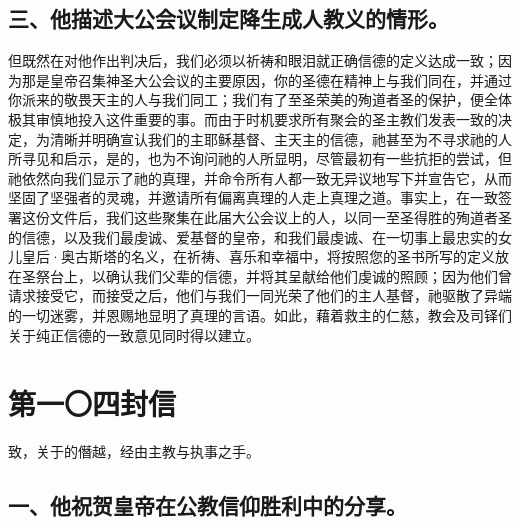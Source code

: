 
\subsection{三、他描述大公会议制定降生成人教义的情形。}

但既然在对他作出判决后，我们必须以祈祷和眼泪就正确信德的定义达成一致；因为那是皇帝召集神圣大公会议的主要原因，你的圣德在精神上与我们同在，并通过你派来的敬畏天主的人与我们同工；我们有了至圣荣美的殉道者圣的保护，便全体极其审慎地投入这件重要的事。而由于时机要求所有聚会的圣主教们发表一致的决定，为清晰并明确宣认我们的主耶稣基督、主天主的信德，祂甚至为不寻求祂的人所寻见和启示，是的，也为不询问祂的人所显明，尽管最初有一些抗拒的尝试，但祂依然向我们显示了祂的真理，并命令所有人都一致无异议地写下并宣告它，从而坚固了坚强者的灵魂，并邀请所有偏离真理的人走上真理之道。事实上，在一致签署这份文件后，我们这些聚集在此届大公会议上的人，以同一至圣得胜的殉道者圣的信德，以及我们最虔诚、爱基督的皇帝，和我们最虔诚、在一切事上最忠实的女儿皇后·奥古斯塔的名义，在祈祷、喜乐和幸福中，将按照您的圣书所写的定义放在圣祭台上，以确认我们父辈的信德，并将其呈献给他们虔诚的照顾；因为他们曾请求接受它，而接受之后，他们与我们一同光荣了他们的主人基督，祂驱散了异端的一切迷雾，并恩赐地显明了真理的言语。如此，藉着救主的仁慈，教会及司铎们关于纯正信德的一致意见同时得以建立。\par



\section{第一〇四封信}

致，关于的僭越，经由主教与执事之手。\par


\subsection{一、他祝贺皇帝在公教信仰胜利中的分享。}

